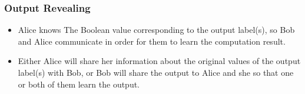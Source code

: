 \subsubsection{Output Revealing}
\begin{itemize}
  \item Alice knows The Boolean value corresponding to the output label(s), so Bob and Alice communicate in order for them to learn the computation result.
  \item Either Alice will share her information about the original values of the output label(s) with Bob, or Bob will share the output to Alice and she so that one or both of them learn the output.
\end{itemize}







